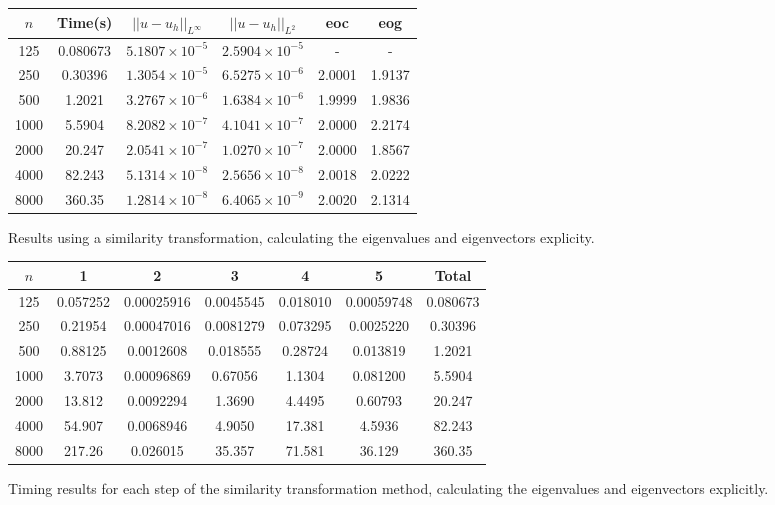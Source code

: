 \documentclass{article}
\numberwithin{equation}{section}
\begin{document}
\begin{figure}[H]
\centering
\begin{tabular}{|c|c|c|c|c|c|}
\hline
$n$ & Time(s) & $|| u - u_h ||_{L^{\infty}}$ &$|| u - u_h ||_{L^{2}}$ & eoc & eog\\
\hline
125 & 0.080673 & $5.1807 \times 10^{-5}$ & $2.5904 \times 10^{-5}$ & - & -  \\
250 & 0.30396 & $1.3054 \times 10^{-5}$ & $6.5275 \times 10^{-6}$ & 2.0001 & 1.9137  \\
500 & 1.2021 & $3.2767 \times 10^{-6}$ & $1.6384 \times 10^{-6}$ & 1.9999 & 1.9836 \\
1000 & 5.5904 & $8.2082 \times 10^{-7}$ & $4.1041 \times 10^{-7}$ & 2.0000 & 2.2174  \\
2000 & 20.247 & $2.0541 \times 10^{-7}$ & $1.0270 \times 10^{-7}$ & 2.0000 & 1.8567 \\
4000 & 82.243 & $5.1314 \times 10^{-8}$ & $2.5656 \times 10^{-8}$ & 2.0018 & 2.0222  \\
8000 & 360.35 & $1.2814 \times 10^{-8}$ & $6.4065 \times 10^{-9}$ & 2.0020 & 2.1314  \\
\hline
\end{tabular}
\captionsetup{justification=centering}
\caption{Results using a similarity transformation, calculating the eigenvalues and eigenvectors explicity.}
\end{figure}

\begin{figure}[H]
\centering
\begin{tabular}{|c|c|c|c|c|c|c|}
\hline
$n$ & 1 & 2 & 3 & 4 & 5 & Total \\
\hline
125 & 0.057252 & 0.00025916 & 0.0045545 & 0.018010 & 0.00059748 & 0.080673 \\
250 & 0.21954 & 0.00047016 & 0.0081279 & 0.073295 & 0.0025220 & 0.30396 \\ 
500 & 0.88125 & 0.0012608 & 0.018555 & 0.28724 & 0.013819 & 1.2021  \\
1000 & 3.7073 & 0.00096869 & 0.67056 & 1.1304 & 0.081200 & 5.5904 \\
2000 & 13.812 & 0.0092294 & 1.3690 & 4.4495 & 0.60793 & 20.247 \\
4000 & 54.907 & 0.0068946 & 4.9050 & 17.381 & 4.5936 & 82.243 \\
8000 & 217.26 & 0.026015 & 35.357 & 71.581 & 36.129 & 360.35 \\
\hline
\end{tabular}
\captionsetup{justification=centering}
\caption{Timing results for each step of the similarity transformation method, calculating the eigenvalues and eigenvectors explicitly.}
\end{figure}
\end{document}
